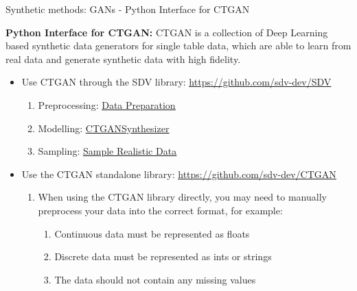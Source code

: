 \documentclass[
	aspectratio = 169
 ]{beamer}
\begin{document}
\begin{frame}{Synthetic methods: GANs - Python Interface for CTGAN}

    \textbf{Python Interface for CTGAN:} CTGAN is a collection of Deep Learning based synthetic data generators for single table data, which are able to learn from real data and generate synthetic data with high fidelity.
    \begin{itemize}
    \item Use CTGAN through the SDV library: \href{https://github.com/sdv-dev/SDV}{\color{blue}\underline{https://github.com/sdv-dev/SDV}}
        \begin{enumerate}
           \item Preprocessing: \href{https://docs.sdv.dev/sdv/single-table-data/data-preparation}{\color{blue}\underline{Data Preparation}}
           \item Modelling: \href{https://docs.sdv.dev/sdv/single-table-data/modeling/synthesizers/ctgansynthesizer}{\color{blue}\underline{CTGANSynthesizer}}
           \item Sampling: \href{https://docs.sdv.dev/sdv/single-table-data/sampling/sample-realistic-data}{\color{blue}\underline{Sample Realistic Data}}
        \end{enumerate}
    \item Use the CTGAN standalone library: \href{https://github.com/sdv-dev/CTGAN}{\color{blue}\underline{https://github.com/sdv-dev/CTGAN}}
            \begin{enumerate}
                \item When using the CTGAN library directly, you may need to manually preprocess your data into the correct format, for example:
                \begin{enumerate}
                    \item Continuous data must be represented as floats
                    \item Discrete data must be represented as ints or strings
                    \item The data should not contain any missing values
                \end{enumerate}
        \end{enumerate}
    \end{itemize}

\end{frame}
\end{document}
